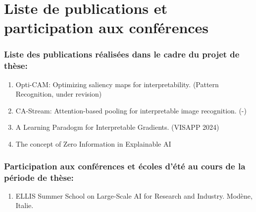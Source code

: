 \newpage
\chapter*{Liste de publications et participation aux conférences}
\subsection*{Liste des publications réalisées dans le cadre du projet de thèse:}
\begin{enumerate}
    \item Opti-CAM: Optimizing saliency maps for interpretability. (Pattern Recognition, under revision)
    \item CA-Stream: Attention-based pooling for interpretable image recognition. (-)
    \item A Learning Paradogm for Interpretable Gradients. (VISAPP 2024)
    \item The concept of Zero Information in Explainable AI
\end{enumerate}


\subsection*{Participation aux conférences et écoles d’été au cours de la période de thèse:}
\begin{enumerate}
\item ELLIS Summer School on Large-Scale AI for Research and Industry. Modène, Italie.
\end{enumerate}
